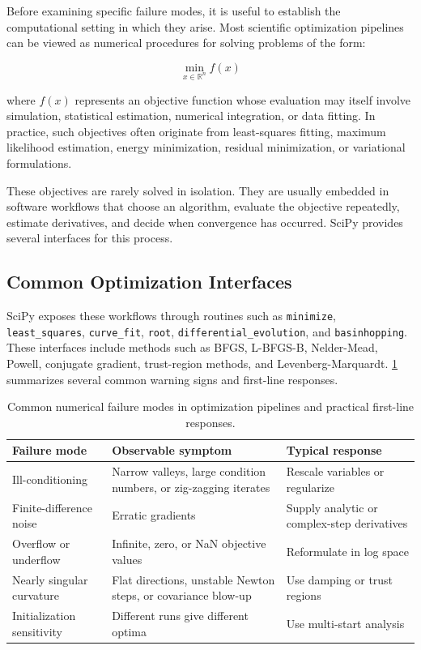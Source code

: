 Before examining specific failure modes, it is useful to establish the computational setting in which they arise. Most scientific optimization pipelines can be viewed as numerical procedures for solving problems of the form:

\begin{equation}
\min_{x \in \mathbb{R}^n} f(x)
\end{equation}

where $f(x)$ represents an objective function whose evaluation may itself involve simulation, statistical estimation, numerical integration, or data fitting. In practice, such objectives often originate from least-squares fitting, maximum likelihood estimation, energy minimization, residual minimization, or variational formulations.

These objectives are rarely solved in isolation. They are usually embedded in software workflows that choose an algorithm, evaluate the objective repeatedly, estimate derivatives, and decide when convergence has occurred. SciPy provides several interfaces for this process.

\subsection{Common Optimization Interfaces}

SciPy exposes these workflows through routines such as \texttt{minimize}, \texttt{least\_squares}, \texttt{curve\_fit}, \texttt{root}, \texttt{differential\_evolution}, and \texttt{basinhopping}. These interfaces include methods such as BFGS, L-BFGS-B, Nelder-Mead, Powell, conjugate gradient, trust-region methods, and Levenberg-Marquardt. \cref{tab:failure-modes} summarizes several common warning signs and first-line responses.

\begin{table}
\centering
\begin{tabular}{p{}p{}p{}}
\hline
\textbf{Failure mode} & \textbf{Observable symptom} & \textbf{Typical response} \\
\hline
Ill-conditioning & Narrow valleys, large condition numbers, or zig-zagging iterates & Rescale variables or regularize \\
Finite-difference noise & Erratic gradients & Supply analytic or complex-step derivatives \\
Overflow or underflow & Infinite, zero, or NaN objective values & Reformulate in log space \\
Nearly singular curvature & Flat directions, unstable Newton steps, or covariance blow-up & Use damping or trust regions \\
Initialization sensitivity & Different runs give different optima & Use multi-start analysis \\
\hline
\end{tabular}
\caption{Common numerical failure modes in optimization pipelines and practical first-line responses.}
\label{tab:failure-modes}
\end{table}

